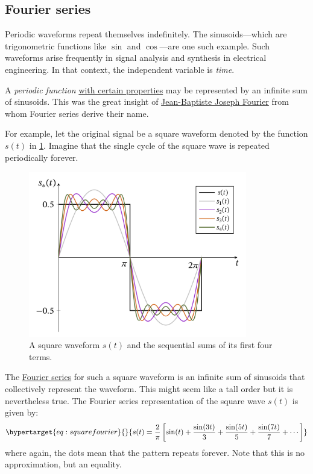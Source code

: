 \documentclass[
  a4paper,
]{article}
\begin{document}
\hypertarget{fourier-series}{%
\subsection{Fourier series}\label{fourier-series}}

Periodic waveforms repeat themselves indefinitely. The sinusoids---which
are trigonometric functions like \(\sin\) and \(\cos\)---are one such
example. Such waveforms arise frequently in signal analysis and
synthesis in electrical engineering. In that context, the independent
variable is \emph{time}.

A \emph{periodic function}
\href{https://eng.libretexts.org/Bookshelves/Electrical_Engineering/Signal_Processing_and_Modeling/Signals_and_Systems_(Baraniuk_et_al.)/06\%3A_Continuous_Time_Fourier_Series_(CTFS)/6.06\%3A_Convergence_of_Fourier_Series}{with
certain properties} may be represented by an infinite sum of sinusoids.
This was the great insight of
\href{https://en.wikipedia.org/wiki/Joseph_Fourier}{Jean-Baptiste Joseph
Fourier} from whom Fourier series derive their name.

For example, let the original signal be a square waveform denoted by the
function \(s(t)\) in \cref{fig:squarefourier}. Imagine that the single
cycle of the square wave is repeated periodically forever.

\begin{figure}
\hypertarget{fig:squarefourier}{%
\centering
\includegraphics[width=0.85\textwidth,height=\textheight]{images/squarefourier.png}
\caption{A square waveform \(s(t)\) and the sequential sums of its first
four terms.}\label{fig:squarefourier}
}
\end{figure}

The \href{https://mathworld.wolfram.com/FourierSeries.html}{Fourier
series} for such a square waveform is an infinite sum of sinusoids that
collectively represent the waveform. This might seem like a tall order
but it is nevertheless true. The Fourier series representation of the
square wave \(s(t)\) is given by:
\begin{equation}\protect\hypertarget{eq:squarefourier}{}{
s(t) = \frac{2}{\pi}\left[\sin(t) + \frac{\sin(3t)}{3} + \frac{\sin(5t)}{5} +  \frac{\sin(7t)} {7} + \cdots\right]
}\label{eq:squarefourier}\end{equation} where again, the dots mean that
the pattern repeats forever. Note that this is no approximation, but an
equality.
\end{document}
